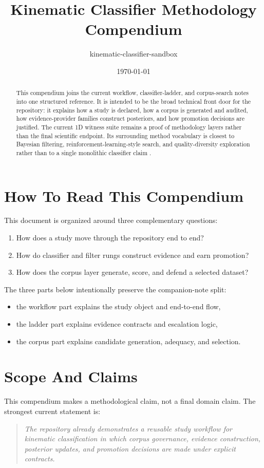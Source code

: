 \documentclass[11pt]{article}
\title{Kinematic Classifier Methodology Compendium}
\author{kinematic-classifier-sandbox}
\date{\today}
\begin{document}
\maketitle

\begin{abstract}
This compendium joins the current workflow, classifier-ladder, and corpus-search notes into one structured reference. It is intended to be the broad technical front door for the repository: it explains how a study is declared, how a corpus is generated and audited, how evidence-provider families construct posteriors, and how promotion decisions are justified. The current 1D witness suite remains a proof of methodology layers rather than the final scientific endpoint. Its surrounding method vocabulary is closest to Bayesian filtering, reinforcement-learning-style search, and quality-diversity exploration rather than to a single monolithic classifier claim \cite{barshalom,bishop,sutton_barto,mouret_clune}.
\end{abstract}

\tableofcontents
\clearpage

\section{How To Read This Compendium}
This document is organized around three complementary questions:
\begin{enumerate}[leftmargin=1.5em]
  \item How does a study move through the repository end to end?
  \item How do classifier and filter rungs construct evidence and earn promotion?
  \item How does the corpus layer generate, score, and defend a selected dataset?
\end{enumerate}

The three parts below intentionally preserve the companion-note split:
\begin{itemize}[leftmargin=1.5em]
  \item the workflow part explains the study object and end-to-end flow,
  \item the ladder part explains evidence contracts and escalation logic,
  \item the corpus part explains candidate generation, adequacy, and selection.
\end{itemize}

\section{Scope And Claims}
This compendium makes a methodological claim, not a final domain claim. The strongest current statement is:
\begin{quote}
\textit{The repository already demonstrates a reusable study workflow for kinematic classification in which corpus governance, evidence construction, posterior updates, and promotion decisions are made under explicit contracts.}
\end{quote}
\end{document}
